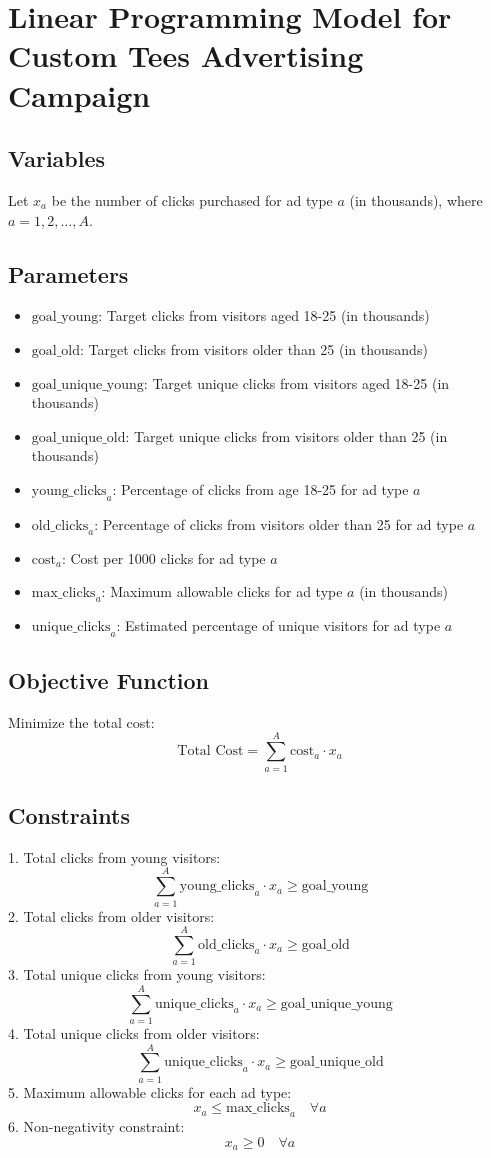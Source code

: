 \documentclass{article}
\begin{document}
\section*{Linear Programming Model for Custom Tees Advertising Campaign}

\subsection*{Variables}
Let \( x_a \) be the number of clicks purchased for ad type \( a \) (in thousands), where \( a = 1, 2, \ldots, A \).

\subsection*{Parameters}
\begin{itemize}
    \item \( \text{goal\_young} \): Target clicks from visitors aged 18-25 (in thousands)
    \item \( \text{goal\_old} \): Target clicks from visitors older than 25 (in thousands)
    \item \( \text{goal\_unique\_young} \): Target unique clicks from visitors aged 18-25 (in thousands)
    \item \( \text{goal\_unique\_old} \): Target unique clicks from visitors older than 25 (in thousands)
    \item \( \text{young\_clicks}_a \): Percentage of clicks from age 18-25 for ad type \( a \)
    \item \( \text{old\_clicks}_a \): Percentage of clicks from visitors older than 25 for ad type \( a \)
    \item \( \text{cost}_a \): Cost per 1000 clicks for ad type \( a \)
    \item \( \text{max\_clicks}_a \): Maximum allowable clicks for ad type \( a \) (in thousands)
    \item \( \text{unique\_clicks}_a \): Estimated percentage of unique visitors for ad type \( a \)
\end{itemize}

\subsection*{Objective Function}
Minimize the total cost:
\[
\text{Total Cost} = \sum_{a=1}^{A} \text{cost}_a \cdot x_a
\]

\subsection*{Constraints}
1. Total clicks from young visitors:
\[
\sum_{a=1}^{A} \text{young\_clicks}_a \cdot x_a \geq \text{goal\_young}
\]
2. Total clicks from older visitors:
\[
\sum_{a=1}^{A} \text{old\_clicks}_a \cdot x_a \geq \text{goal\_old}
\]
3. Total unique clicks from young visitors:
\[
\sum_{a=1}^{A} \text{unique\_clicks}_a \cdot x_a \geq \text{goal\_unique\_young}
\]
4. Total unique clicks from older visitors:
\[
\sum_{a=1}^{A} \text{unique\_clicks}_a \cdot x_a \geq \text{goal\_unique\_old}
\]
5. Maximum allowable clicks for each ad type:
\[
x_a \leq \text{max\_clicks}_a \quad \forall a
\]
6. Non-negativity constraint:
\[
x_a \geq 0 \quad \forall a
\]
\end{document}

